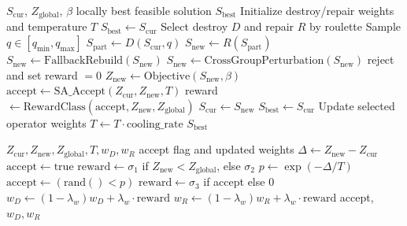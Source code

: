 \documentclass[review,12pt]{elsarticle}
\begin{document}
\begin{algorithm}[t]
\caption{ALNS Local Search Procedure}
\label{alg:alns_local}
\begin{algorithmic}[1]
\Require \(S_{\mathrm{cur}}\), \(Z_{\mathrm{global}}\), \(\beta\)
\Ensure locally best feasible solution \(S_{\mathrm{best}}\)
\State Initialize destroy/repair weights and temperature \(T\)
\State \(S_{\mathrm{best}} \gets S_{\mathrm{cur}}\)
  \State Select destroy \(D\) and repair \(R\) by roulette
  \State Sample \(q\in[q_{\min}, q_{\max}]\)
  \State \(S_{\mathrm{part}} \gets D(S_{\mathrm{cur}}, q)\)
  \State \(S_{\mathrm{new}} \gets R(S_{\mathrm{part}})\)
    \State \(S_{\mathrm{new}} \gets \mathrm{FallbackRebuild}(S_{\mathrm{new}})\)
  \EndIf
    \State \(S_{\mathrm{new}} \gets \mathrm{CrossGroupPerturbation}(S_{\mathrm{new}})\)
  \EndIf
    \State reject and set reward \(=0\)
  \Else
    \State \(Z_{\mathrm{new}} \gets \mathrm{Objective}(S_{\mathrm{new}},\beta)\)
    \State \(\mathrm{accept}\gets \mathrm{SA\_Accept}(Z_{\mathrm{cur}},Z_{\mathrm{new}},T)\)
    \State reward \(\gets \mathrm{RewardClass}(\mathrm{accept}, Z_{\mathrm{new}}, Z_{\mathrm{global}})\)
  \EndIf
    \State \(S_{\mathrm{cur}} \gets S_{\mathrm{new}}\)
  \EndIf
    \State \(S_{\mathrm{best}} \gets S_{\mathrm{cur}}\)
  \EndIf
  \State Update selected operator weights
  \State \(T \gets T\cdot \mathrm{cooling\_rate}\)
\EndFor
\State \Return \(S_{\mathrm{best}}\)
\end{algorithmic}
\end{algorithm}

\begin{algorithm}[t]
\caption{SA Acceptance and Adaptive Weight Update}
\label{alg:sa_weight}
\begin{algorithmic}[1]
\Require \(Z_{\mathrm{cur}}, Z_{\mathrm{new}}, Z_{\mathrm{global}}, T, w_D, w_R\)
\Ensure accept flag and updated weights
\State \(\Delta \gets Z_{\mathrm{new}} - Z_{\mathrm{cur}}\)
  \State \(\mathrm{accept}\gets \mathrm{true}\)
  \State \(\mathrm{reward}\gets \sigma_1\) if \(Z_{\mathrm{new}}<Z_{\mathrm{global}}\), else \(\sigma_2\)
\Else
  \State \(p\gets \exp(-\Delta/T)\)
  \State \(\mathrm{accept}\gets (\mathrm{rand}() < p)\)
  \State \(\mathrm{reward}\gets \sigma_3\) if accept else \(0\)
\EndIf
\State \(w_D \gets (1-\lambda_w)w_D + \lambda_w\cdot \mathrm{reward}\)
\State \(w_R \gets (1-\lambda_w)w_R + \lambda_w\cdot \mathrm{reward}\)
\State \Return accept, \(w_D, w_R\)
\end{algorithmic}
\end{algorithm}
\end{document}
